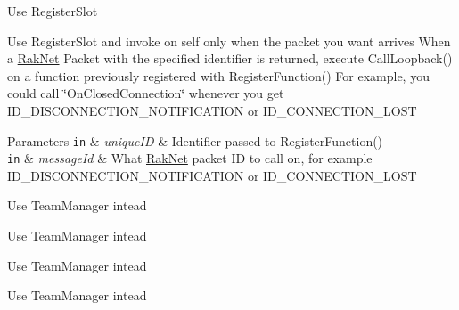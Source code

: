 \begin{DoxyRefList}
\item[\label{deprecated__deprecated000005}%
\hypertarget{deprecated__deprecated000005}{}%
Member \hyperlink{class_rak_net_1_1_r_p_c4_a62122f90344dbfc064f9b14e0f565b23}{Rak\-Net\-:\-:R\-P\-C4\-:\-:Register\-Function} (const char $\ast$unique\-I\-D, void($\ast$function\-Pointer)(\hyperlink{class_rak_net_1_1_bit_stream}{Rak\-Net\-::\-Bit\-Stream} $\ast$user\-Data, Packet $\ast$packet))]Use Register\-Slot  
\item[\label{deprecated__deprecated000006}%
\hypertarget{deprecated__deprecated000006}{}%
Member \hyperlink{class_rak_net_1_1_r_p_c4_a71f5f6d32e12adf3715d9c5faea25439}{Rak\-Net\-:\-:R\-P\-C4\-:\-:Register\-Local\-Callback} (const char $\ast$unique\-I\-D, Message\-I\-D message\-Id)]Use Register\-Slot and invoke on self only when the packet you want arrives When a \hyperlink{namespace_rak_net}{Rak\-Net} Packet with the specified identifier is returned, execute Call\-Loopback() on a function previously registered with Register\-Function() For example, you could call \char`\"{}\-On\-Closed\-Connection\char`\"{} whenever you get I\-D\-\_\-\-D\-I\-S\-C\-O\-N\-N\-E\-C\-T\-I\-O\-N\-\_\-\-N\-O\-T\-I\-F\-I\-C\-A\-T\-I\-O\-N or I\-D\-\_\-\-C\-O\-N\-N\-E\-C\-T\-I\-O\-N\-\_\-\-L\-O\-S\-T 
\begin{DoxyParams}[1]{Parameters}
\mbox{\tt in}  & {\em unique\-I\-D} & Identifier passed to Register\-Function() \\
\hline
\mbox{\tt in}  & {\em message\-Id} & What \hyperlink{namespace_rak_net}{Rak\-Net} packet I\-D to call on, for example I\-D\-\_\-\-D\-I\-S\-C\-O\-N\-N\-E\-C\-T\-I\-O\-N\-\_\-\-N\-O\-T\-I\-F\-I\-C\-A\-T\-I\-O\-N or I\-D\-\_\-\-C\-O\-N\-N\-E\-C\-T\-I\-O\-N\-\_\-\-L\-O\-S\-T  \\
\hline
\end{DoxyParams}

\item[\label{deprecated__deprecated000012}%
\hypertarget{deprecated__deprecated000012}{}%
Class \hyperlink{class_rak_net_1_1_team_balancer}{Rak\-Net\-:\-:Team\-Balancer} ]Use Team\-Manager intead  
\item[\label{deprecated__deprecated000011}%
\hypertarget{deprecated__deprecated000011}{}%
Member \hyperlink{group___t_e_a_m___b_a_l_a_n_c_e_r___g_r_o_u_p_ga79c7825649955f28135498fb3d9f6894}{Rak\-Net\-:\-:Team\-Id} ]Use Team\-Manager intead  
\item[\label{deprecated__deprecated000010}%
\hypertarget{deprecated__deprecated000010}{}%
Group \hyperlink{group___t_e_a_m___b_a_l_a_n_c_e_r___g_r_o_u_p}{T\-E\-A\-M\-\_\-\-B\-A\-L\-A\-N\-C\-E\-R\-\_\-\-G\-R\-O\-U\-P} ]Use Team\-Manager intead  
\item[\label{deprecated__deprecated000009}%
\hypertarget{deprecated__deprecated000009}{}%
File \hyperlink{_team_balancer_8h}{Team\-Balancer.h} ]Use Team\-Manager intead 
\end{DoxyRefList}